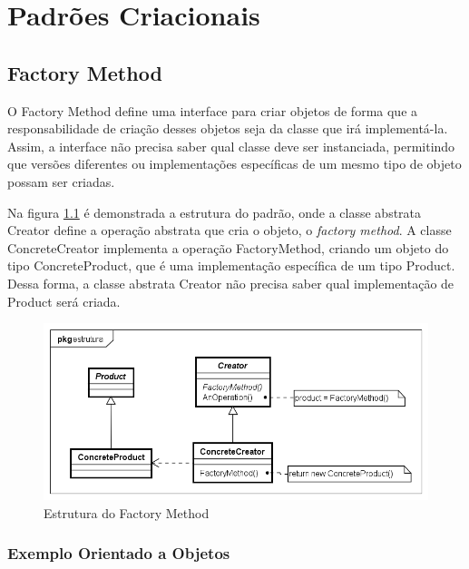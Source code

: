 \chapter{Padrões Criacionais}

\section{Factory Method}

O Factory Method define uma interface para criar 
objetos de forma que a responsabilidade de criação 
desses objetos seja da classe que irá implementá-la. 
Assim, a interface não precisa saber qual 
classe deve ser instanciada, permitindo que versões 
diferentes ou implementações específicas de um mesmo 
tipo de objeto possam ser criadas.\cite{gamma:1995}

Na figura \ref{fmethod_struct} é demonstrada 
a estrutura do padrão, onde a classe abstrata Creator 
define a operação abstrata que cria o objeto, 
o \textit{factory method}. A classe ConcreteCreator 
implementa a operação FactoryMethod, criando um objeto 
do tipo ConcreteProduct, que é uma implementação 
específica de um tipo Product. Dessa forma, a classe 
abstrata Creator não precisa saber qual implementação 
de Product será criada.

\begin{figure}[htb]
	\caption{\label{fmethod_struct}Estrutura do Factory Method}
	\begin{center}
	    \includegraphics[scale=0.5]{5_padroes-contexto-funcional/5.1_criacionais/5.1.1_factory-method/factorymethod_struct.png}
	\end{center}
\end{figure}


\subsection*{Exemplo Orientado a Objetos}

